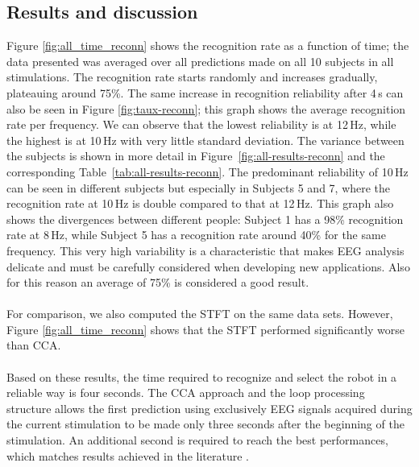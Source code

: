 \documentclass[smallextended]{svjour3}
\begin{document}
\subsection{Results and discussion}
Figure \ref{fig:all_time_reconn} shows the recognition rate as a function of time; the data presented was averaged over all predictions made on all 10 subjects in all stimulations.
The recognition rate starts randomly and increases gradually, plateauing around 75\%.
The same increase in recognition reliability after 4\,s can also be seen in Figure \ref{fig:taux-reconn}; this graph shows the average recognition rate per frequency.
We can observe that the lowest reliability is at 12\,Hz, while the highest is at 10\,Hz with very little standard deviation.
The variance between the subjects is shown in more detail in Figure~\ref{fig:all-results-reconn} and the corresponding Table~\ref{tab:all-results-reconn}.
The predominant reliability of 10\,Hz can be seen in different subjects but especially in Subjects 5 and 7, where the recognition rate at 10\,Hz is double compared to that at 12\,Hz.
This graph also shows the divergences between different people: Subject 1 has a 98\% recognition rate at 8\,Hz, while Subject 5 has a recognition rate around 40\% for the same frequency.
This very high variability is a characteristic that makes EEG analysis delicate and must be carefully considered when developing new applications. 
Also for this reason an average of 75\% is considered a good result.\\
\\
For comparison, we also computed the STFT on the same data sets.
However, Figure \ref{fig:all_time_reconn} shows that the STFT performed significantly worse than CCA.\\
\\
Based on these results, the time required to recognize and select the robot in a reliable way is four seconds. 
The CCA approach and the loop processing structure allows the first prediction using exclusively EEG signals acquired during the current stimulation to be made only three seconds after the beginning of the stimulation.
An additional second is required to reach the best performances, which matches results achieved in the literature \cite{Fan2015,SSVEPfiability,jian2014improving,paper4}. 
\end{document}
